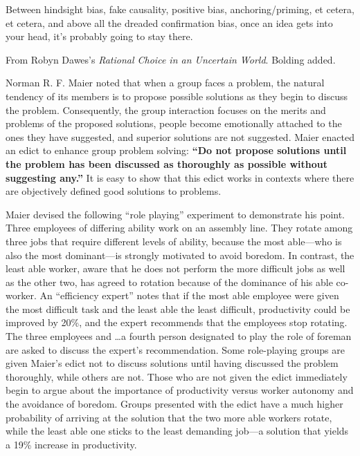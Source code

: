 {
 Between hindsight bias, fake causality, positive bias,
anchoring/priming, et cetera, et cetera, and above all the dreaded
confirmation bias, once an idea gets into your head,
it's probably going to stay there.}

\myendsectiontext


\bigskip


{
 From Robyn Dawes's \textit{Rational Choice in an
Uncertain World}. Bolding added.}

{
 Norman R. F. Maier noted that when a group faces a problem, the
natural tendency of its members is to propose possible solutions as
they begin to discuss the problem. Consequently, the group interaction
focuses on the merits and problems of the proposed solutions, people
become emotionally attached to the ones they have suggested, and
superior solutions are not suggested. Maier enacted an edict to enhance
group problem solving: \textbf{``Do not propose
solutions until the problem has been discussed as thoroughly as
possible without suggesting any.''} It is easy to
show that this edict works in contexts where there are objectively
defined good solutions to problems.}

{
 Maier devised the following ``role
playing'' experiment to demonstrate his point. Three
employees of differing ability work on an assembly line. They rotate
among three jobs that require different levels of ability, because the
most able---who is also the most dominant---is strongly motivated to
avoid boredom. In contrast, the least able worker, aware that he does
not perform the more difficult jobs as well as the other two, has
agreed to rotation because of the dominance of his able co-worker. An
``efficiency expert'' notes that if
the most able employee were given the most difficult task and the least
able the least difficult, productivity could be improved by 20\%, and
the expert recommends that the employees stop rotating. The three
employees and \ldots a fourth person designated to play the role of
foreman are asked to discuss the expert's
recommendation. Some role-playing groups are given
Maier's edict not to discuss solutions until having
discussed the problem thoroughly, while others are not. Those who are
not given the edict immediately begin to argue about the importance of
productivity versus worker autonomy and the avoidance of boredom.
Groups presented with the edict have a much higher probability of
arriving at the solution that the two more able workers rotate, while
the least able one sticks to the least demanding job---a solution that
yields a 19\% increase in productivity.}


